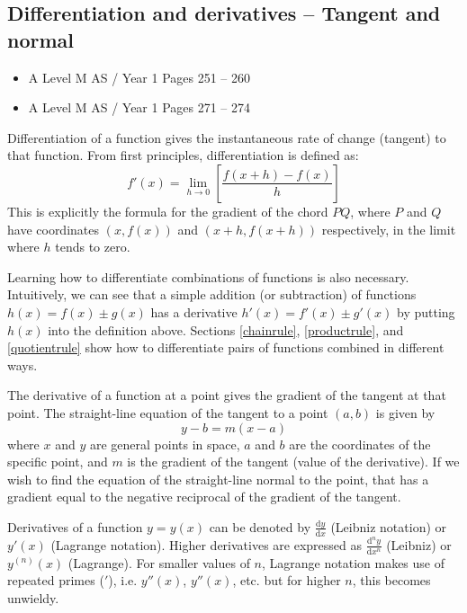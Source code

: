 \documentclass[11pt, a4paper]{article}
\begin{document}
\subsection{Differentiation and derivatives -- Tangent and normal}
\begin{itemize}
\item A Level M AS / Year 1 \hspace{1cm} \phantom{ } Pages 251 -- 260 
\item A Level M AS / Year 1 \hspace{1cm} \phantom{ } Pages 271 -- 274
\end{itemize} \par
Differentiation of a function gives the instantaneous rate of change (tangent) to that function. 
From first principles, differentiation is defined as:
\begin{equation*}
f'(x)=\lim_{h \to 0}\left[ \frac{f(x+h)-f(x)}{h} \right]
\end{equation*}
This is explicitly the formula for the gradient of the chord $PQ$, where $P$ and $Q$ have coordinates $(x,f(x))$ and $(x+h,f(x+h))$ respectively, in the limit where $h$ tends to zero. \newline \par
Learning how to differentiate combinations of functions is also necessary. Intuitively, we can see that a simple addition (or subtraction) of functions $h(x)=f(x)\pm g(x)$ has a derivative $h'(x)=f'(x)\pm g'(x)$ by putting $h(x)$ into the definition above. Sections \ref{chainrule}, \ref{productrule}, and \ref{quotientrule} show how to differentiate pairs of functions combined in different ways. \newline \par
The derivative of a function at a point gives the gradient of the tangent at that point. The straight-line equation of the tangent to a point $(a,b)$ is given by
\begin{equation*}
y-b=m(x-a)
\end{equation*}
where $x$ and $y$ are general points in space, $a$ and $b$ are the coordinates of the specific point, and $m$ is the gradient of the tangent (value of the derivative). If we wish to find the equation of the straight-line normal to the point, that has a gradient equal to the negative reciprocal of the gradient of the tangent. \newline \par
Derivatives of a function $y=y(x)$ can be denoted by $\frac{\mathrm{d}y}{\mathrm{d}x}$ (Leibniz notation) or $y'(x)$ (Lagrange notation). Higher derivatives are expressed as $\frac{\mathrm{d}^{n}y}{\mathrm{d}x^{n}}$ (Leibniz) or $y^{(n)}(x)$ (Lagrange). For smaller values of $n$, Lagrange notation makes use of repeated primes ($'$), i.e. $y''(x)$, $y''(x)$, etc. but for higher $n$, this becomes unwieldy. \newline \par
\end{document}

